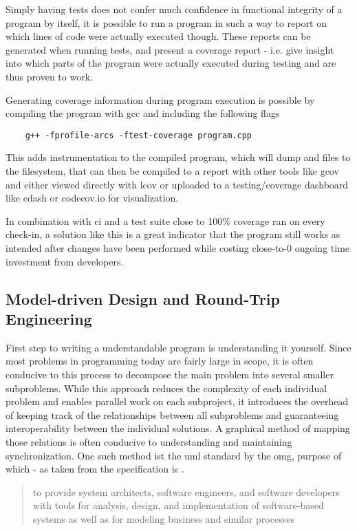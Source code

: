 Simply having tests does not confer much confidence in functional integrity of a program by itself, it is possible to run a program in such a way to report on which lines of code were actually executed though. These reports can be generated when running tests, and present a \gls{coverage} report - i.e. give insight into which parts of the program were actually executed during testing and are thus proven to work.

Generating coverage information during program execution is possible by compiling the program with gcc and including the following flags
\begin{lstlisting}
	g++ -fprofile-arcs -ftest-coverage program.cpp
\end{lstlisting}

This adds instrumentation to the compiled program, which will dump  and  files to the filesystem, that can then be compiled to a report with other tools like gcov and either viewed directly with lcov or uploaded to a testing/coverage dashboard like cdash or codecov.io for visualization.

In combination with \gls{ci} and a test suite close to 100\% \gls{coverage} ran on every check-in, a solution like this is a great indicator that the program still works as intended after changes have been performed while costing close-to-0 ongoing time investment from developers.

\subsection{Model-driven Design and Round-Trip Engineering}
First step to writing a understandable program is understanding it yourself. Since most problems in programming today are fairly large in scope, it is often conducive to this process to decompose the main problem into several smaller subproblems. While this approach reduces the complexity of each individual problem and enables parallel work on each subproject, it introduces the overhead of keeping track of the relationships between all subproblems and guaranteeing interoperability between the individual solutions. A graphical method of mapping those relations is often conducive to understanding and maintaining synchronization. One such method ist the \gls{uml} standard by the \gls{omg}, purpose of which - as taken from the specification is .
\begin{quote}
to provide system architects, software engineers, and software developers with tools for analysis, design, and implementation of software-based systems as well as for modeling business and similar processes
\end{quote}

